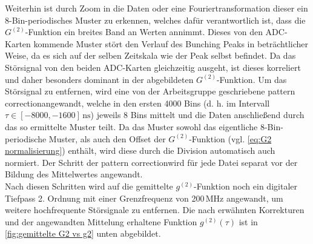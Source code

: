 Weiterhin ist durch Zoom in die Daten oder eine Fouriertransformation dieser ein 8-Bin-periodisches Muster zu erkennen, welches dafür verantwortlich ist, dass die $G^{(2)}$-Funktion ein breites Band an Werten annimmt. 
Dieses von den ADC-Karten kommende Muster stört den Verlauf des Bunching Peaks in beträchtlicher Weise, da es sich auf der selben Zeitskala wie der Peak selbst befindet. 
Da das Störsignal von den beiden ADC-Karten gleichzeitig ausgeht, ist dieses korreliert und daher besonders dominant in der abgebildeten $G^{(2)}$-Funktion.
Um das Störsignal zu entfernen, wird eine von der Arbeitsgruppe geschriebene \glqq pattern correction\grqq\;angewandt, welche in den ersten 4000 Bins (d. h. im Intervall $\tau\in[-8000,-1600]\,\mathrm{ns}$) jeweils 8 Bins mittelt und die Daten anschließend durch das so ermittelte Muster teilt. 
Da das Muster sowohl das eigentliche 8-Bin-periodische Muster, als auch den Offset der $G^{(2)}$-Funktion (vgl. \autoref{eq:G2 normalisierung}) enthält, wird diese durch die Division automatisch auch normiert. 
Der Schritt der \glqq pattern correction\grqq\;wird für jede Datei separat vor der Bildung des Mittelwertes angewandt. \\
Nach diesen Schritten wird auf die gemittelte $g^{(2)}$-Funktion noch ein digitaler Tiefpass 2. Ordnung mit einer Grenzfrequenz von 200\,MHz angewandt, um weitere hochfrequente Störsignale zu entfernen. 
Die nach erwähnten Korrekturen und der angewandten Mittelung erhaltene Funktion $g^{(2)}(\tau)$ ist in \autoref{fig:gemittelte G2 vs g2} unten abgebildet. 

